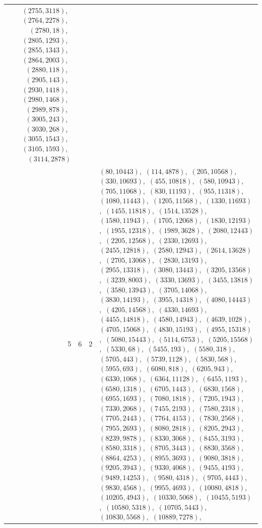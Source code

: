 \documentclass[11pt]{article}
\begin{document}
\begin{longtable}{@{}rrl>{\raggedright\arraybackslash}p{}@{}}
$(2755,3118)$,\allowbreak\ $(2764,2278)$,\allowbreak\ $(2780,18)$,\allowbreak\ $(2805,1293)$,\allowbreak\ $(2855,1343)$,\allowbreak\ $(2864,2003)$,\allowbreak\ $(2880,118)$,\allowbreak\ $(2905,143)$,\allowbreak\ $(2930,1418)$,\allowbreak\ $(2980,1468)$,\allowbreak\ $(2989,878)$,\allowbreak\ $(3005,243)$,\allowbreak\ $(3030,268)$,\allowbreak\ $(3055,1543)$,\allowbreak\ $(3105,1593)$,\allowbreak\ $(3114,2878)$\\
5 & 6 & $2$ & $(80,10443)$,\allowbreak\ $(114,4878)$,\allowbreak\ $(205,10568)$,\allowbreak\ $(330,10693)$,\allowbreak\ $(455,10818)$,\allowbreak\ $(580,10943)$,\allowbreak\ $(705,11068)$,\allowbreak\ $(830,11193)$,\allowbreak\ $(955,11318)$,\allowbreak\ $(1080,11443)$,\allowbreak\ $(1205,11568)$,\allowbreak\ $(1330,11693)$,\allowbreak\ $(1455,11818)$,\allowbreak\ $(1514,13528)$,\allowbreak\ $(1580,11943)$,\allowbreak\ $(1705,12068)$,\allowbreak\ $(1830,12193)$,\allowbreak\ $(1955,12318)$,\allowbreak\ $(1989,3628)$,\allowbreak\ $(2080,12443)$,\allowbreak\ $(2205,12568)$,\allowbreak\ $(2330,12693)$,\allowbreak\ $(2455,12818)$,\allowbreak\ $(2580,12943)$,\allowbreak\ $(2614,13628)$,\allowbreak\ $(2705,13068)$,\allowbreak\ $(2830,13193)$,\allowbreak\ $(2955,13318)$,\allowbreak\ $(3080,13443)$,\allowbreak\ $(3205,13568)$,\allowbreak\ $(3239,8003)$,\allowbreak\ $(3330,13693)$,\allowbreak\ $(3455,13818)$,\allowbreak\ $(3580,13943)$,\allowbreak\ $(3705,14068)$,\allowbreak\ $(3830,14193)$,\allowbreak\ $(3955,14318)$,\allowbreak\ $(4080,14443)$,\allowbreak\ $(4205,14568)$,\allowbreak\ $(4330,14693)$,\allowbreak\ $(4455,14818)$,\allowbreak\ $(4580,14943)$,\allowbreak\ $(4639,1028)$,\allowbreak\ $(4705,15068)$,\allowbreak\ $(4830,15193)$,\allowbreak\ $(4955,15318)$,\allowbreak\ $(5080,15443)$,\allowbreak\ $(5114,6753)$,\allowbreak\ $(5205,15568)$,\allowbreak\ $(5330,68)$,\allowbreak\ $(5455,193)$,\allowbreak\ $(5580,318)$,\allowbreak\ $(5705,443)$,\allowbreak\ $(5739,1128)$,\allowbreak\ $(5830,568)$,\allowbreak\ $(5955,693)$,\allowbreak\ $(6080,818)$,\allowbreak\ $(6205,943)$,\allowbreak\ $(6330,1068)$,\allowbreak\ $(6364,11128)$,\allowbreak\ $(6455,1193)$,\allowbreak\ $(6580,1318)$,\allowbreak\ $(6705,1443)$,\allowbreak\ $(6830,1568)$,\allowbreak\ $(6955,1693)$,\allowbreak\ $(7080,1818)$,\allowbreak\ $(7205,1943)$,\allowbreak\ $(7330,2068)$,\allowbreak\ $(7455,2193)$,\allowbreak\ $(7580,2318)$,\allowbreak\ $(7705,2443)$,\allowbreak\ $(7764,4153)$,\allowbreak\ $(7830,2568)$,\allowbreak\ $(7955,2693)$,\allowbreak\ $(8080,2818)$,\allowbreak\ $(8205,2943)$,\allowbreak\ $(8239,9878)$,\allowbreak\ $(8330,3068)$,\allowbreak\ $(8455,3193)$,\allowbreak\ $(8580,3318)$,\allowbreak\ $(8705,3443)$,\allowbreak\ $(8830,3568)$,\allowbreak\ $(8864,4253)$,\allowbreak\ $(8955,3693)$,\allowbreak\ $(9080,3818)$,\allowbreak\ $(9205,3943)$,\allowbreak\ $(9330,4068)$,\allowbreak\ $(9455,4193)$,\allowbreak\ $(9489,14253)$,\allowbreak\ $(9580,4318)$,\allowbreak\ $(9705,4443)$,\allowbreak\ $(9830,4568)$,\allowbreak\ $(9955,4693)$,\allowbreak\ $(10080,4818)$,\allowbreak\ $(10205,4943)$,\allowbreak\ $(10330,5068)$,\allowbreak\ $(10455,5193)$,\allowbreak\ $(10580,5318)$,\allowbreak\ $(10705,5443)$,\allowbreak\ $(10830,5568)$,\allowbreak\ $(10889,7278)$,\allowbreak\ 
\end{longtable}
\end{document}
